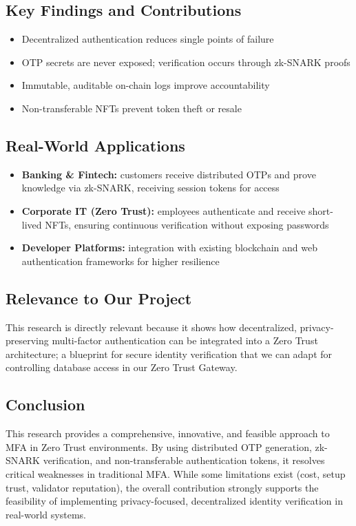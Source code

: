 \subsection{Key Findings and Contributions}

\begin{itemize}
    \item Decentralized authentication reduces single points of failure
    \item OTP secrets are never exposed; verification occurs through zk-SNARK proofs
    \item Immutable, auditable on-chain logs improve accountability
    \item Non-transferable NFTs prevent token theft or resale
\end{itemize}

\subsection{Real-World Applications}

\begin{itemize}
    \item \textbf{Banking \& Fintech:} customers receive distributed OTPs and prove knowledge via zk-SNARK, receiving session tokens for access
    \item \textbf{Corporate IT (Zero Trust):} employees authenticate and receive short-lived NFTs, ensuring continuous verification without exposing passwords
    \item \textbf{Developer Platforms:} integration with existing blockchain and web authentication frameworks for higher resilience
\end{itemize}

\subsection{Relevance to Our Project}

This research is directly relevant because it shows how decentralized, privacy-preserving multi-factor authentication can be integrated into a Zero Trust architecture; a blueprint for secure identity verification that we can adapt for controlling database access in our Zero Trust Gateway.

\subsection{Conclusion}

This research provides a comprehensive, innovative, and feasible approach to MFA in Zero Trust environments. By using distributed OTP generation, zk-SNARK verification, and non-transferable authentication tokens, it resolves critical weaknesses in traditional MFA. While some limitations exist (cost, setup trust, validator reputation), the overall contribution strongly supports the feasibility of implementing privacy-focused, decentralized identity verification in real-world systems.

